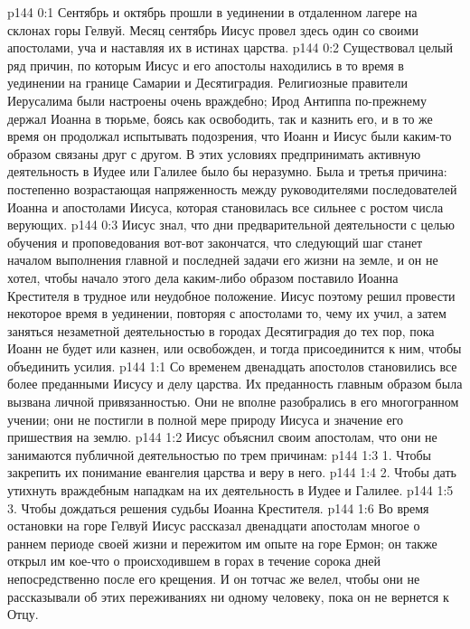 \vs p144 0:1 Сентябрь и октябрь прошли в уединении в отдаленном лагере на склонах горы Гелвуй. Месяц сентябрь Иисус провел здесь один со своими апостолами, уча и наставляя их в истинах царства.
\vs p144 0:2 Существовал целый ряд причин, по которым Иисус и его апостолы находились в то время в уединении на границе Самарии и Десятиградия. Религиозные правители Иерусалима были настроены очень враждебно; Ирод Антиппа по\hyp{}прежнему держал Иоанна в тюрьме, боясь как освободить, так и казнить его, и в то же время он продолжал испытывать подозрения, что Иоанн и Иисус были каким\hyp{}то образом связаны друг с другом. В этих условиях предпринимать активную деятельность в Иудее или Галилее было бы неразумно. Была и третья причина: постепенно возрастающая напряженность между руководителями последователей Иоанна и апостолами Иисуса, которая становилась все сильнее с ростом числа верующих.
\vs p144 0:3 Иисус знал, что дни предварительной деятельности с целью обучения и проповедования вот\hyp{}вот закончатся, что следующий шаг станет началом выполнения главной и последней задачи его жизни на земле, и он не хотел, чтобы начало этого дела каким\hyp{}либо образом поставило Иоанна Крестителя в трудное или неудобное положение. Иисус поэтому решил провести некоторое время в уединении, повторяя с апостолами то, чему их учил, а затем заняться незаметной деятельностью в городах Десятиградия до тех пор, пока Иоанн не будет или казнен, или освобожден, и тогда присоединится к ним, чтобы объединить усилия.
\vs p144 1:1 Со временем двенадцать апостолов становились все более преданными Иисусу и делу царства. Их преданность главным образом была вызвана личной привязанностью. Они не вполне разобрались в его многогранном учении; они не постигли в полной мере природу Иисуса и значение его пришествия на землю.
\vs p144 1:2 Иисус объяснил своим апостолам, что они не занимаются публичной деятельностью по трем причинам:
\vs p144 1:3 1. Чтобы закрепить их понимание евангелия царства и веру в него.
\vs p144 1:4 2. Чтобы дать утихнуть враждебным нападкам на их деятельность в Иудее и Галилее.
\vs p144 1:5 3. Чтобы дождаться решения судьбы Иоанна Крестителя.
\vs p144 1:6 Во время остановки на горе Гелвуй Иисус рассказал двенадцати апостолам многое о раннем периоде своей жизни и пережитом им опыте на горе Ермон; он также открыл им кое\hyp{}что о происходившем в горах в течение сорока дней непосредственно после его крещения. И он тотчас же велел, чтобы они не рассказывали об этих переживаниях ни одному человеку, пока он не вернется к Отцу.
